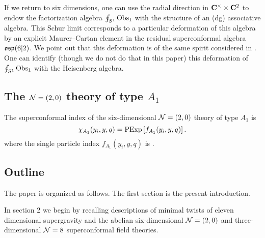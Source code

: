 \documentclass[11pt]{amsart}
\begin{document}
If we return to six dimensions, one can use the radial direction in $\mathbf{C}^\times \times \mathbf{C}^2$ to endow the factorization algebra $\oint_{S^1} \operatorname{Obs}_1$ with the structure of an (dg) associative algebra. 
This Schur limit corresponds to a particular deformation of this algebra by an explicit Maurer--Cartan element in the residual superconformal algebra $\mathfrak{osp}(6|2)$.
We point out that this deformation is of the same spirit considered in \cite{BeemEtAl}.
One can identify (though we do not do that in this paper) this deformation of $\oint_{S^1} \operatorname{Obs}_1$ with the Heisenberg algebra. 

\subsection*{The $\mathcal N=(2,0)$ theory of type $A_1$} 

\begin{conj}\label{conj:6dtwo}
The superconformal index of the six-dimensional $\mathcal N=(2,0)$ theory of type $A_1$ is 
\[
\chi_{A_1} (y_i,y,q) = {\rm PExp} \left[f_{A_1}(y_i,y,q) \right] .
\]
where the single particle index $f_{A_1}(y_i,y,q)$ is 
\beqn\label{eqn:A1}
.
\eeqn
\end{conj}

\subsection{Outline}

The paper is organized as follows. The first section is the present introduction.

In section 2 we begin by recalling descriptions of minimal twists of eleven dimensional supergravity \cite{} and the abelian six-dimensional $\mathcal N=(2,0)$ \cite{} and three-dimensional $\mathcal N=8$ \cite{} superconformal field theories.
\end{document}
